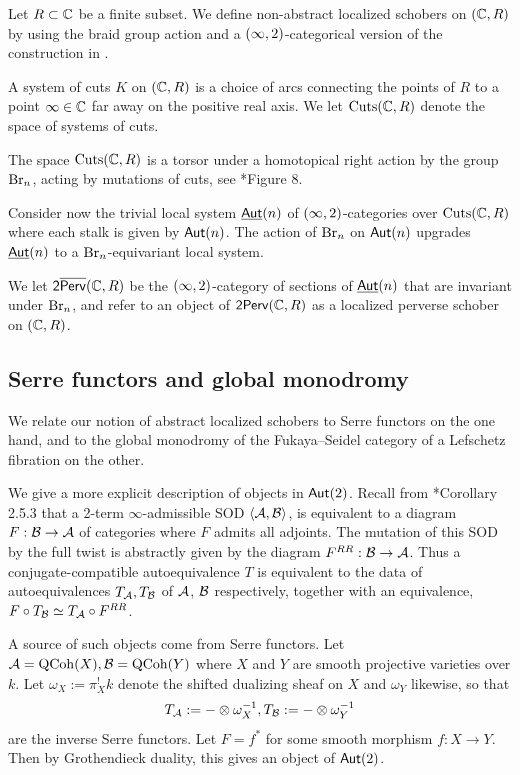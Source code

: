 Let $R\subset\mathbb{C}$ be a finite subset. We define non-abstract localized schobers on $(\mathbb{C},R)$ by using the braid group action and a $(\infty,2)$-categorical version of the construction in \cite{kapranovPerverseSchobers2015}. 

\begin{defn}\label{defn:cuts}
    A system of cuts $K$ on $(\mathbb{C},R)$ is a choice of arcs connecting the points of $R$ to a point $\infty\in\mathbb{C}$ far away on the positive real axis. We let $\operatorname{Cuts}(\mathbb{C},R)$ denote the space of systems of cuts. 
\end{defn}

The space $\operatorname{Cuts}(\mathbb{C},R)$ is a torsor under a homotopical right action by the group $\operatorname{Br}_n$, acting by mutations of cuts, see \cite{kapranovPerverseSchobersAlgebra2020}*{Figure 8}.

Consider now the trivial local system $\underline{\mathsf{Aut}}(n)$ of $(\infty,2)$-categories over $\operatorname{Cuts}(\mathbb{C},R)$ where each stalk is given by $\mathsf{Aut}(n)$. The action of $\operatorname{Br}_n$ on $\mathsf{Aut}(n)$ upgrades $\underline{\mathsf{Aut}}(n)$ to a $\operatorname{Br}_n$-equivariant local system.

\begin{defn}\label{defn:nonabstract}
    We let $\mathsf{2}\overline{\mathsf{Perv}}(\mathbb{C},R)$ be the $(\infty,2)$-category of sections of $\underline{\mathsf{Aut}}(n)$ that are invariant under $\operatorname{Br}_n$, and refer to an object of $\mathsf{2Perv}(\mathbb{C},R)$ as a localized perverse schober on $(\mathbb{C},R)$.
\end{defn}

\subsection{Serre functors and global monodromy}\label{subsection:interpretation}
We relate our notion of abstract localized schobers to Serre functors on the one hand, and to the global monodromy of the Fukaya--Seidel category of a Lefschetz fibration on the other.

\begin{eg}\label{eg:aut2}
    We give a more explicit description of objects in $\mathsf{Aut}(2)$. Recall from \cite{dyckerhoffSphericalAdjunctionsStable2021}*{Corollary 2.5.3} that a 2-term $\infty$-admissible SOD $\langle\mathcal{A},\mathcal{B}\rangle$, is equivalent to a diagram $F:\mathcal{B}\to\mathcal{A}$ of categories where $F$ admits all adjoints. The mutation of this SOD by the full twist is abstractly given by the diagram $F^{RR}:\mathcal{B}\to\mathcal{A}$. Thus a conjugate-compatible autoequivalence $T$ is equivalent to the data of autoequivalences $T_{\mathcal{A}},T_{\mathcal{B}}$ of $\mathcal{A}$, $\mathcal{B}$ respectively, together with an equivalence, $F\circ T_{\mathcal{B}}\simeq T_{\mathcal{A}}\circ F^{RR}$.

    A source of such objects come from Serre functors. Let $\mathcal{A} = \operatorname{QCoh}(X),\mathcal{B} = \operatorname{QCoh}(Y)$ where $X$ and $Y$ are smooth projective varieties over $k$. Let $\omega_X := \pi_X^!k$ denote the shifted dualizing sheaf on $X$ and $\omega_Y$ likewise, so that
    \[T_{\mathcal{A}} := -\otimes\omega_X^{-1},T_{\mathcal{B}} := -\otimes\omega_Y^{-1}\]
    are the inverse Serre functors. Let $F = f^*$ for some smooth morphism $f:X\to Y$. Then by Grothendieck duality, this gives an object of $\mathsf{Aut}(2)$.
\end{eg}

